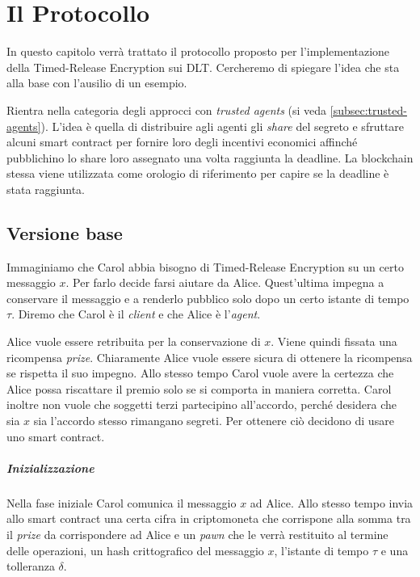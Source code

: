 \chapter{Il Protocollo}
\label{chap:protocollo}

In questo capitolo verrà trattato il protocollo proposto per l'implementazione
della Timed-Release Encryption sui DLT.
Cercheremo di spiegare
l'idea che sta alla base con l'ausilio di un esempio.

Rientra nella categoria degli approcci
con \textit{trusted agents} (si veda \ref{subsec:trusted-agents}).
L'idea è quella di distribuire agli agenti gli \textit{share} del segreto
e sfruttare alcuni smart contract per
fornire loro degli incentivi economici affinché pubblichino lo share
loro assegnato una volta raggiunta la deadline.
La blockchain stessa viene utilizzata come orologio di riferimento
per capire se la deadline è stata raggiunta.

\section{Versione base}
\label{sec:versione-base}
Immaginiamo che Carol abbia bisogno di Timed-Release Encryption su un certo messaggio $ x $.
Per farlo decide farsi aiutare da Alice. Quest'ultima
impegna a conservare il messaggio e a renderlo pubblico solo dopo un
certo istante di tempo $ \tau $.
Diremo che Carol è il \textit{client} e che Alice è l'\textit{agent}.

Alice vuole essere retribuita per la conservazione di $ x $. Viene quindi fissata
una ricompensa \textit{prize}. Chiaramente Alice vuole essere sicura di
ottenere la ricompensa se rispetta il suo impegno. Allo stesso tempo Carol
vuole avere la certezza che Alice possa riscattare il premio solo se si comporta
in maniera corretta.
Carol inoltre non vuole che soggetti terzi partecipino all'accordo, perché desidera
che sia $ x $ sia l'accordo stesso rimangano segreti.
Per ottenere ciò decidono di usare uno smart contract.

\paragraph{Inizializzazione}
Nella fase iniziale Carol comunica il messaggio $ x $ ad Alice. Allo stesso tempo invia
allo smart contract una certa cifra in criptomoneta
che corrispone alla somma tra il \textit{prize} da corrispondere ad Alice e un
\textit{pawn} che le verrà restituito al termine delle operazioni, un hash
crittografico del messaggio $ x $, l'istante di tempo $ \tau $ e una tolleranza $ \delta $.

